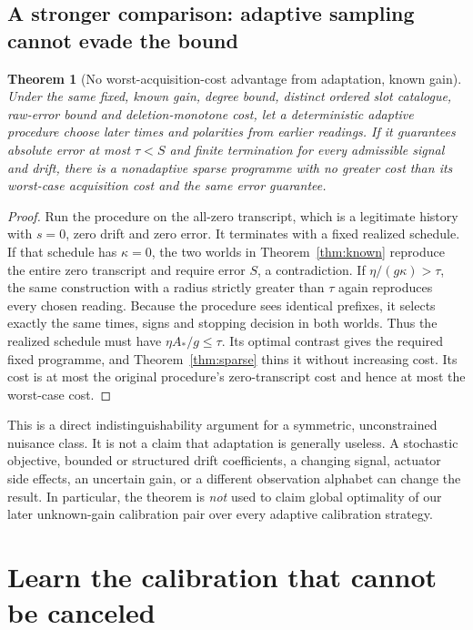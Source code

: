 \documentclass[11pt,letterpaper]{article}
\newtheorem{theorem}{Theorem}[section]
\theoremstyle{definition}\newtheorem{definition}[theorem]{Definition}
\theoremstyle{remark}\newtheorem{remark}[theorem]{Remark}
\begin{document}
\subsection{A stronger comparison: adaptive sampling cannot evade the bound}
\begin{theorem}[No worst-acquisition-cost advantage from adaptation, known gain]
\label{thm:adaptive}
Under the same fixed, known gain, degree bound, distinct ordered slot catalogue, raw-error bound and deletion-monotone cost, let a deterministic adaptive procedure choose later times and polarities from earlier readings. If it guarantees absolute error at most $\tau<S$ and finite termination for every admissible signal and drift, there is a nonadaptive sparse programme with no greater cost than its worst-case acquisition cost and the same error guarantee.
\end{theorem}
\begin{proof}
Run the procedure on the all-zero transcript, which is a legitimate history with $s=0$, zero drift and zero error. It terminates with a fixed realized schedule. If that schedule has $\kappa=0$, the two worlds in Theorem~\ref{thm:known} reproduce the entire zero transcript and require error $S$, a contradiction. If $\eta/(g\kappa)>\tau$, the same construction with a radius strictly greater than $\tau$ again reproduces every chosen reading. Because the procedure sees identical prefixes, it selects exactly the same times, signs and stopping decision in both worlds. Thus the realized schedule must have $\eta A_*/g\le\tau$. Its optimal contrast gives the required fixed programme, and Theorem~\ref{thm:sparse} thins it without increasing cost. Its cost is at most the original procedure's zero-transcript cost and hence at most the worst-case cost.
\end{proof}

This is a direct indistinguishability argument for a symmetric, unconstrained nuisance class. It is not a claim that adaptation is generally useless. A stochastic objective, bounded or structured drift coefficients, a changing signal, actuator side effects, an uncertain gain, or a different observation alphabet can change the result. In particular, the theorem is \emph{not} used to claim global optimality of our later unknown-gain calibration pair over every adaptive calibration strategy.

\section{Learn the calibration that cannot be canceled}
\label{sec:calibration}
\end{document}

